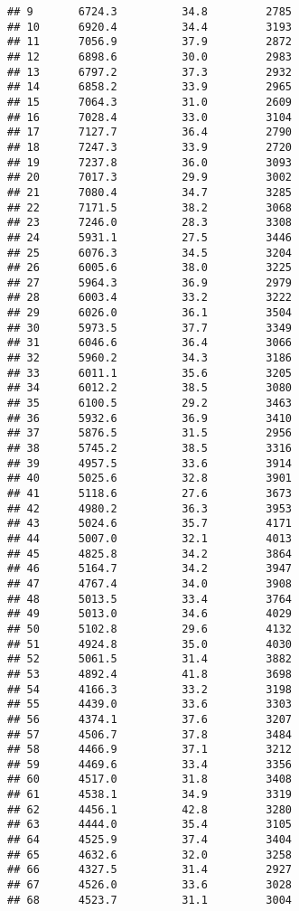 \documentclass[]{book}
\begin{document}
\begin{verbatim}
## 9       6724.3          34.8         2785
## 10      6920.4          34.4         3193
## 11      7056.9          37.9         2872
## 12      6898.6          30.0         2983
## 13      6797.2          37.3         2932
## 14      6858.2          33.9         2965
## 15      7064.3          31.0         2609
## 16      7028.4          33.0         3104
## 17      7127.7          36.4         2790
## 18      7247.3          33.9         2720
## 19      7237.8          36.0         3093
## 20      7017.3          29.9         3002
## 21      7080.4          34.7         3285
## 22      7171.5          38.2         3068
## 23      7246.0          28.3         3308
## 24      5931.1          27.5         3446
## 25      6076.3          34.5         3204
## 26      6005.6          38.0         3225
## 27      5964.3          36.9         2979
## 28      6003.4          33.2         3222
## 29      6026.0          36.1         3504
## 30      5973.5          37.7         3349
## 31      6046.6          36.4         3066
## 32      5960.2          34.3         3186
## 33      6011.1          35.6         3205
## 34      6012.2          38.5         3080
## 35      6100.5          29.2         3463
## 36      5932.6          36.9         3410
## 37      5876.5          31.5         2956
## 38      5745.2          38.5         3316
## 39      4957.5          33.6         3914
## 40      5025.6          32.8         3901
## 41      5118.6          27.6         3673
## 42      4980.2          36.3         3953
## 43      5024.6          35.7         4171
## 44      5007.0          32.1         4013
## 45      4825.8          34.2         3864
## 46      5164.7          34.2         3947
## 47      4767.4          34.0         3908
## 48      5013.5          33.4         3764
## 49      5013.0          34.6         4029
## 50      5102.8          29.6         4132
## 51      4924.8          35.0         4030
## 52      5061.5          31.4         3882
## 53      4892.4          41.8         3698
## 54      4166.3          33.2         3198
## 55      4439.0          33.6         3303
## 56      4374.1          37.6         3207
## 57      4506.7          37.8         3484
## 58      4466.9          37.1         3212
## 59      4469.6          33.4         3356
## 60      4517.0          31.8         3408
## 61      4538.1          34.9         3319
## 62      4456.1          42.8         3280
## 63      4444.0          35.4         3105
## 64      4525.9          37.4         3404
## 65      4632.6          32.0         3258
## 66      4327.5          31.4         2927
## 67      4526.0          33.6         3028
## 68      4523.7          31.1         3004
\end{verbatim}
\end{document}
